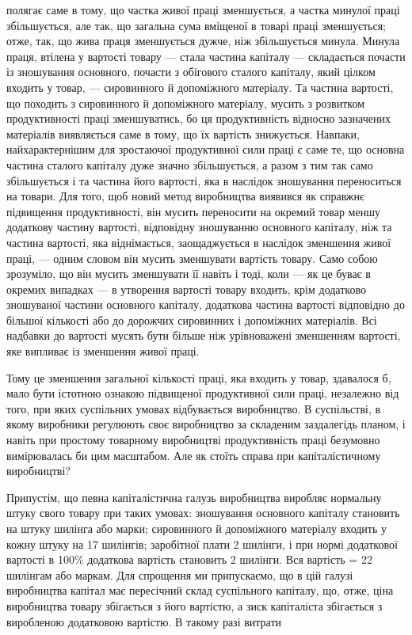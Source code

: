 \parcont{}  %
полягає саме в тому, що частка живої праці зменшується,
а частка минулої праці збільшується, але так, що загальна сума
вміщеної в товарі праці зменшується; отже, так, що жива праця
зменшується дужче, ніж збільшується минула. Минула праця,
втілена у вартості товару — стала частина капіталу — складається
почасти із зношування основного, почасти з обігового
сталого капіталу, який цілком входить у товар, — сировинного
й допоміжного матеріалу. Та частина вартості, що походить
з сировинного й допоміжного матеріалу, мусить з розвитком
продуктивності праці зменшуватись, бо ця продуктивність відносно
зазначених матеріалів виявляється саме в тому, що їх вартість
знижується. Навпаки, найхарактернішим для зростаючої
продуктивної сили праці є саме те, що основна частина сталого
капіталу дуже значно збільшується, а разом з тим так само
збільшується і та частина його вартості, яка в наслідок зношування
переноситься на товари. Для того, щоб новий метод
виробництва виявився як справжнє підвищення продуктивності,
він мусить переносити на окремий товар меншу додаткову частину
вартості, відповідну зношуванню основного капіталу,
ніж та частина вартості, яка віднімається, заощаджується в наслідок
зменшення живої праці, — одним словом він мусить зменшувати
вартість товару. Само собою зрозуміло, що він мусить
зменшувати її навіть і тоді, коли — як це буває в окремих випадках
— в утворення вартості товару входить, крім додатково зношуваної
частини основного капіталу, додаткова частина вартості
відповідно до більшої кількості або до дорожчих сировинних і
допоміжних матеріалів. Всі надбавки до вартості мусять бути
більше ніж урівноважені зменшенням вартості, яке випливає із
зменшення живої праці.

Тому це зменшення загальної кількості праці, яка входить
у товар, здавалося б, мало бути істотною ознакою підвищеної
продуктивної сили праці, незалежно від того, при яких суспільних
умовах відбувається виробництво. В суспільстві, в якому
виробники регулюють своє виробництво за складеним заздалегідь
планом, і навіть при простому товарному виробництві продуктивність
праці безумовно вимірювалась би цим масштабом.
Але як стоїть справа при капіталістичному виробництві?

Припустім, що певна капіталістична галузь виробництва
виробляє нормальну штуку свого товару при таких умовах: зношування
основного капіталу становить на штуку  шилінга або
марки; сировинного й допоміжного матеріалу входить у кожну
штуку на 17 шилінгів; заробітної плати 2 шилінги, і при нормі
додаткової вартості в 100\% додаткова вартість становить 2 шилінги.
Вся вартість = 22 шилінгам або маркам. Для спрощення
ми припускаємо, що в цій галузі виробництва капітал має пересічний
склад суспільного капіталу, що, отже, ціна виробництва
товару збігається з його вартістю, а зиск капіталіста збігається
з виробленою додатковою вартістю. В такому разі витрати
\parbreak{}  %
